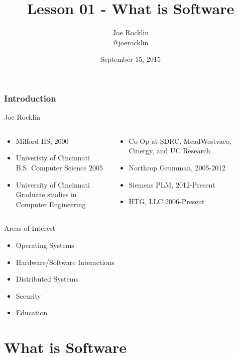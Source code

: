\documentclass[serif,mathserif]{beamer}
\author[Joe Rocklin]{Joe Rocklin\\@joerocklin}
\title[Lesson 01\hspace{2em}\insertframenumber/\inserttotalframenumber]{Lesson 01 - What is Software}
\date{September 15, 2015} %
\institute{Siemens PLM Software}
\begin{document}
\maketitle


\begin{frame}
  \frametitle{Introduction}
  Joe Rocklin
  \begin{columns}[T]
  \begin{column}[T]{.5\textwidth}
    \begin{itemize}
    \item Milford HS, 2000
    \item Univeristy of Cincinnati\\B.S. Computer Science 2005
    \item University of Cincinnati\\Graduate studies in Computer Engineering
    \end{itemize}
  \end{column}
  \pause
  \begin{column}[T]{.5\textwidth}
    \begin{itemize}
    \item Co-Op at SDRC, MeadWestvaco, Cinergy, and UC Research
    \item Northrop Grumman, 2005-2012
    \item Siemens PLM, 2012-Present
    \item HTG, LLC 2006-Present
    \end{itemize}
  \end{column}
  \end{columns}
\end{frame}

\begin{frame}{Areas of Interest}
  \begin{itemize}
  \item Operating Systems
  \item Hardware/Software Interactions
  \item Distributed Systems
  \item Security
  \item Education
  \end{itemize}
\end{frame}

\section{What is Software} %
\end{document}
